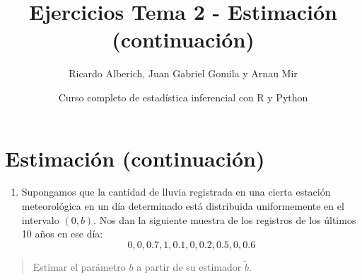 \documentclass[]{article}
\title{Ejercicios Tema 2 - Estimación (continuación)}
\author{Ricardo Alberich, Juan Gabriel Gomila y Arnau Mir}
\date{Curso completo de estadística inferencial con R y Python}
\providecommand{\tightlist}{%
  \setlength{\itemsep}{0pt}\setlength{\parskip}{0pt}}
\begin{document}
\maketitle

\hypertarget{estimaciuxf3n-continuaciuxf3n}{%
\section{Estimación
(continuación)}\label{estimaciuxf3n-continuaciuxf3n}}

\begin{enumerate}
\def\labelenumi{\arabic{enumi}.}
\tightlist
\item
  Supongamos que la cantidad de lluvia registrada en una cierta estación
  meteorológica en un día determinado está distribuida uniformemente en
  el intervalo \((0,b)\). Nos dan la siguiente muestra de los registros
  de los últimos 10 años en ese día: \[0,0,0.7,1,0.1,0,0.2,0.5,0,0.6\]
\end{enumerate}

\begin{quote}
Estimar el parámetro \(b\) a partir de su estimador \(\tilde b\).
\end{quote}
\end{document}
